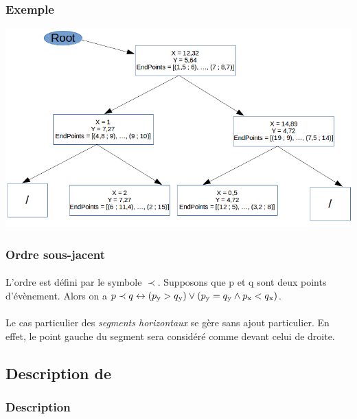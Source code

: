 \documentclass[]{article}
\begin{document}
        \subsubsection{Exemple}\label{subsub:QEx}
        
            \begin{center}
            \includegraphics[width=15cm]{ExempleQPng}
            \end{center}
        \subsubsection{Ordre sous-jacent}\label{subsub:QOrd}
            \paragraph{} L'ordre est défini par le symbole $\prec$. Supposons que p et q sont deux points d'évènement. Alors on a $p \prec q \leftrightarrow (p\textsubscript{y} > q\textsubscript{y}) \vee (p\textsubscript{y} = q\textsubscript{y} \wedge p\textsubscript{x} < q\textsubscript{x})$.
            \paragraph{} Le cas particulier des \emph{segments horizontaux} se gère sans ajout particulier. En effet, le point gauche du segment sera considéré comme devant celui de droite.
        
    \subsection{Description de }\label{sub:mainTDesc}
        \subsubsection{Description}\label{subsub:TDesc}
        
\end{document}
